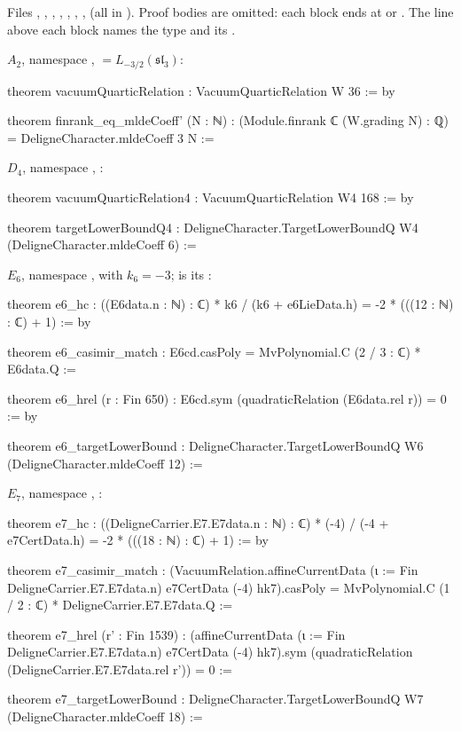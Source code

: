 \noindent Files ,
, , , ,
, ,  (all in
). Proof bodies are omitted: each block ends at \lean{:=} or . The
line above each block names the type and its .

\noindent$A_2$, namespace ,  $=L_{-3/2}(\mathfrak{sl}_3)$:
\begin{leancode}
theorem vacuumQuarticRelation : VacuumQuarticRelation W 36 := by

theorem finrank_eq_mldeCoeff' (N : ℕ) :
    (Module.finrank ℂ (W.grading N) : ℚ) = DeligneCharacter.mldeCoeff 3 N :=
\end{leancode}
\noindent$D_4$, namespace , :
\begin{leancode}
theorem vacuumQuarticRelation4 : VacuumQuarticRelation W4 168 := by

theorem targetLowerBoundQ4 : DeligneCharacter.TargetLowerBoundQ W4 (DeligneCharacter.mldeCoeff 6) :=
\end{leancode}
\noindent$E_6$, namespace ,  with
$k_6=-3$;  is its :
\begin{leancode}
theorem e6_hc : ((E6data.n : ℕ) : ℂ) * k6 / (k6 + e6LieData.h) = -2 * (((12 : ℕ) : ℂ) + 1) := by

theorem e6_casimir_match : E6cd.casPoly = MvPolynomial.C (2 / 3 : ℂ) * E6data.Q :=

theorem e6_hrel (r : Fin 650) : E6cd.sym (quadraticRelation (E6data.rel r)) = 0 := by

theorem e6_targetLowerBound : DeligneCharacter.TargetLowerBoundQ W6 (DeligneCharacter.mldeCoeff 12) :=
\end{leancode}
\noindent$E_7$, namespace , :
\begin{leancode}
theorem e7_hc : ((DeligneCarrier.E7.E7data.n : ℕ) : ℂ) * (-4) / (-4 + e7CertData.h) =
    -2 * (((18 : ℕ) : ℂ) + 1) := by

theorem e7_casimir_match :
    (VacuumRelation.affineCurrentData (ι := Fin DeligneCarrier.E7.E7data.n) e7CertData (-4)
      hk7).casPoly = MvPolynomial.C (1 / 2 : ℂ) * DeligneCarrier.E7.E7data.Q :=

theorem e7_hrel (r' : Fin 1539) :
    (affineCurrentData (ι := Fin DeligneCarrier.E7.E7data.n) e7CertData (-4) hk7).sym
      (quadraticRelation (DeligneCarrier.E7.E7data.rel r')) = 0 :=

theorem e7_targetLowerBound : DeligneCharacter.TargetLowerBoundQ W7 (DeligneCharacter.mldeCoeff 18) :=
\end{leancode}
